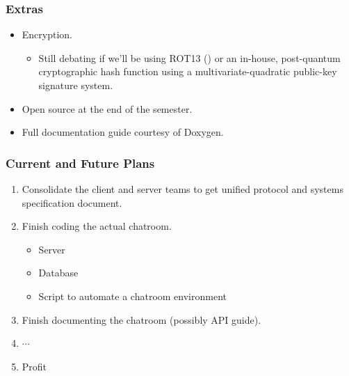 \documentclass{beamer}
\begin{document}
\begin{frame}
    \frametitle{Extras}

    \begin{itemize}
        \item Encryption.
        \begin{itemize}
            \item Still debating if we'll be using ROT13 (\joke) or an in-house, post-quantum cryptographic hash function using a multivariate-quadratic public-key signature system.
        \end{itemize}

        \item Open source \pause at the end of the semester.
        \item Full documentation guide courtesy of Doxygen.
    \end{itemize}
\end{frame}


\begin{frame}
    \frametitle{Current and Future Plans}

    \begin{enumerate}
        \item Consolidate the client and server teams to get unified protocol and systems specification document.
        \item Finish coding the actual chatroom.
        \begin{itemize}
            \item Server
            \item Database
            \item Script to automate a chatroom environment
        \end{itemize}

        \item Finish documenting the chatroom (possibly API guide).

        \pause
        \item $\cdots$
        \item Profit
    \end{enumerate}
\end{frame}
\end{document}
